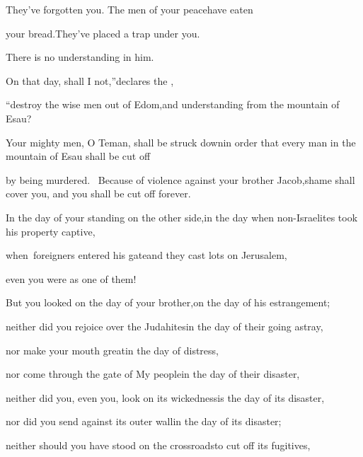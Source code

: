 \begin{inparaenum}
  \pc{}They've forgotten you. The men of your peace\pa{}have eaten%

  \pc{}your bread.\pa{}They've placed a trap under you.%

  \pc{}There is no understanding in him.%

  \pa{} On that day, shall I not,''\pa{}declares the \lord,%

  \pb{}``destroy the wise men out of Edom,\pa{}and understanding from the mountain of Esau?%

  \pa{} Your mighty men, O Teman, shall be struck down\pa{}in order that every man in the mountain of Esau shall be cut off%

  \pb{}by being murdered.\  Because of violence against your brother Jacob,\pa{}shame shall cover you, and you shall be cut off forever.%

  \pa{} In the day of your standing on the other side,\pa{}in the day when non-Israelites took his property captive,%

  \pb{}when\understood{}\ foreigners entered his gate\pa{}and they cast lots on Jerusalem,%

  \pb{}even you were as one of them!%

  \pb{} But you looked on the day of your brother,\pa{}on the day of his estrangement;%

  \pc{}neither did you rejoice over the Judahites\pa{}in the day of their going astray,%

  \pc{}nor make your mouth great\pa{}in the day of distress,%

  \pb{} nor come through the gate of My people\pa{}in the day of their disaster,%

  \pc{}neither did you, even you, look on its wickedness\pa{}is the day of its disaster,%

  \pc{}nor did you send against its outer wall\pa{}in the day of its disaster;%

  \pb{} neither should you have stood on the crossroads\pa{}to cut off its fugitives,%


\end{inparaenum}
